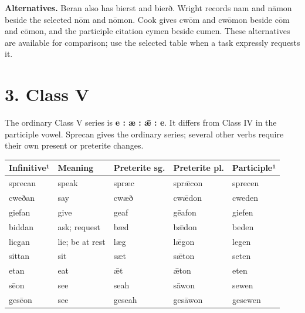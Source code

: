 \textbf{Alternatives.} Beran also has bierst and bierð. Wright records nam and nāmon beside the selected nōm and nōmon. Cook gives cwōm and cwōmon beside cōm and cōmon, and the participle citation cymen beside cumen. These alternatives are available for comparison; use the selected table when a task expressly requests it.

\section*{3. Class V}

The ordinary Class V series is \textbf{e : æ : ǣ : e}. It differs from Class IV in the participle vowel. Sprecan gives the ordinary series; several other verbs require their own present or preterite changes.

\par\begingroup
\fontsize{10.5}{13.2}\selectfont
\setlength{\LTleft}{0pt}\setlength{\LTright}{\fill}
\noindent
\begin{tabular}{@{}>{\raggedright\arraybackslash}p{22.88mm}>{\raggedright\arraybackslash}p{22.05mm}>{\raggedright\arraybackslash}p{22.47mm}>{\raggedright\arraybackslash}p{22.47mm}>{\raggedright\arraybackslash}p{22.88mm}@{}}
\toprule
\textbf{Infinitive¹} & \textbf{Meaning} & \textbf{Preterite sg.} & \textbf{Preterite pl.} & \textbf{Participle¹} \\
\midrule
sprecan & speak & spræc & sprǣcon & sprecen \\
cweðan & say & cwæð & cwǣdon & cweden \\
giefan & give & geaf & gēafon & giefen \\
biddan & ask; request & bæd & bǣdon & beden \\
licgan & lie; be at rest & læg & lǣgon & legen \\
sittan & sit & sæt & sǣton & seten \\
etan & eat & ǣt & ǣton & eten \\
sēon & see & seah & sāwon & sewen \\
gesēon & see & geseah & gesāwon & gesewen \\
\bottomrule
\end{tabular}
\par\endgroup

